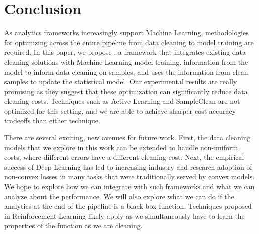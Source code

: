 \vspace{-1em}
\section{Conclusion}
As analytics frameworks increasingly support Machine Learning, methodologies for optimizing across the entire pipeline from data cleaning to model training are required.
In this paper, we propose \sysfull, a framework that integrates existing data cleaning solutions with Machine Learning model training.
\sys information from the model to inform data cleaning on samples, and uses the information from clean samples to update the statistical model.
Our experimental results are really promising as they suggest that these optimization can significantly reduce data cleaning costs.
Techniques such as Active Learning and SampleClean are not optimized for this setting, and we are able to achieve sharper cost-accuracy tradeoffs than either technique.
 
There are several exciting, new avenues for future work.
First, the data cleaning models that we explore in this work can be extended to handle non-uniform costs, where different errors have a different cleaning cost.
Next, the empirical success of Deep Learning has led to increasing industry and research adoption of non-convex losses in many tasks that were traditionally served by convex models.
We hope to explore how we can integrate with such frameworks and what we can analyze about the performance.
We will also explore what we can do if the analytics at the end of the pipeline is a black box function.
Techniques proposed in Reinforcement Learning likely apply as we simultaneously have to learn the properties of the function as we are cleaning.
